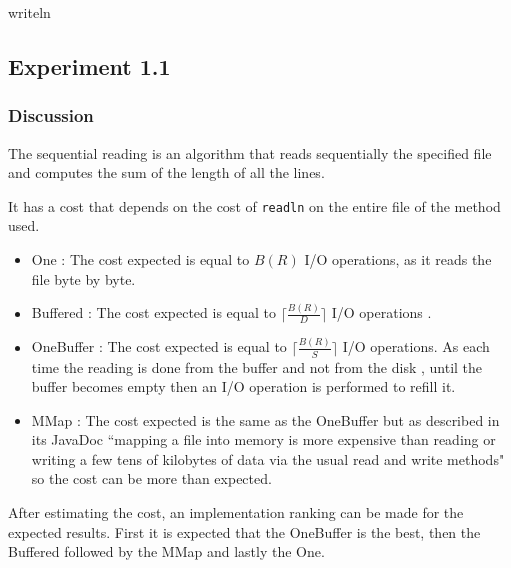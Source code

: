 \documentclass[12pt]{article}
\begin{document}
\begin{algorithm}[H]
\caption{writeln}
\label{algo:8}
\begin{algorithmic}[1]
\ENDIF
{}
\ENDFOR
{}
\end{algorithmic}
\end{algorithm}

\subsection{Experiment 1.1} \label{exp1.1}
\subsubsection{Discussion}
The sequential reading is an algorithm that reads sequentially the specified file and computes the sum of the length of all the lines.

It has a cost that depends on the cost of \texttt{readln} on the entire file of the method used.

\begin{itemize}
    \item One : The cost expected is equal to $B(R)$ I/O operations, as it reads the file byte by byte.
    \item Buffered : The cost expected is equal to $\lceil\frac{B(R)}{D}\rceil$ I/O operations \footnotemark.
    \item OneBuffer : The cost expected is equal to $\lceil\frac{B(R)}{S}\rceil$ I/O operations. As each time the reading is done from the buffer and not from the disk \footnotemark[\value{footnote}], until the buffer becomes empty then an I/O operation is performed to refill it.
    \item MMap : The cost expected is the same as the OneBuffer but as described in its JavaDoc ``mapping a file into memory is more expensive than reading or writing a few tens of kilobytes of data via the usual read and write methods" so the cost can be more than expected.
\end{itemize}

After estimating the cost, an implementation ranking can be made for the expected results. First it is expected that the OneBuffer is the best, then the Buffered followed by the MMap and lastly the One.
\end{document}
